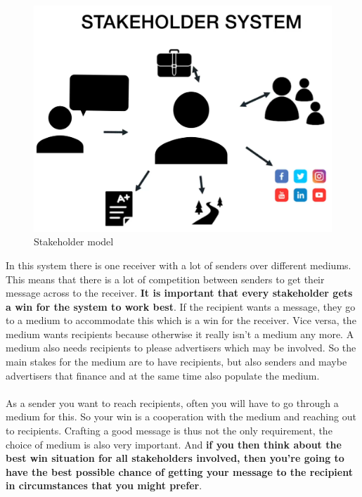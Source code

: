 \documentclass[../summary.tex]{subfiles}
\begin{document}
			\begin{figure}[h]
				\centering
				\includegraphics[width=0.63\linewidth]{../images/12-stakeholder-model.png}
				\caption{Stakeholder model}
				\label{fig:12-stakeholder-model}
			\end{figure}
			\newpage
			In this system there is one receiver with a lot of senders over different mediums. This means that there is a lot of competition between senders to get their message across to the receiver. \textbf{It is important that every stakeholder gets a win for the system to work best}. If the recipient wants a message, they go to a medium to accommodate this which is a win for the receiver. Vice versa, the medium wants recipients because otherwise it really isn't a medium any more. A medium also needs recipients to please advertisers which may be involved.  So the main stakes for the medium are to have recipients, but also senders and maybe advertisers that finance and at the same time also populate the medium.\\
			\\
			As a sender you want to reach recipients, often you will have to go through a medium for this. So your win is a cooperation with the medium and reaching out to recipients. Crafting a good message is thus not the only requirement, the choice of medium is also very important. And \textbf{if you then think about the best win situation for all stakeholders involved, then you're going to have the best possible chance of getting your message to the recipient in circumstances that you might prefer}.
			
\end{document}
